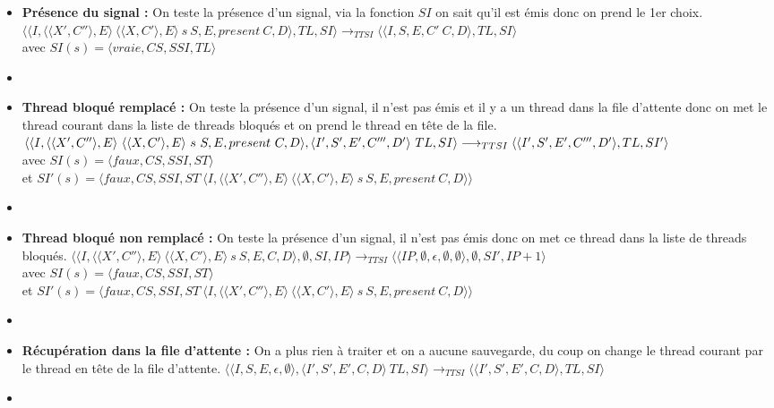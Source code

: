 \documentclass[10pt,a4paper]{report}
\begin{document}
\begin{enumerate}
\begin{itemize}
  \item[] \textbf{Présence du signal :} On teste la présence d'un signal, via la fonction $SI$ on sait qu'il est émis donc on prend le 1er choix.
    \smallbreak
    $\langle\langle I,\langle\langle X',C''\rangle,E\rangle~\langle\langle X,C'\rangle,E\rangle~s~S,E,present~C,D\rangle,TL,SI\rangle 
    \longrightarrow_{TTSI} 
    \langle\langle I,S,E,C'~C,D\rangle,TL,SI\rangle$ 
    \\avec $SI(s) = \langle vraie,CS,SSI,TL\rangle$
  \item[]
    
    
    
    
  \item[] \textbf{ Thread bloqué remplacé :} On teste la présence d'un signal, il n'est pas émis et il y a un thread dans la file d'attente donc on met le thread courant dans la liste de threads bloqués et on prend le thread en tête de la file.
    \smallbreak
    $\langle\langle I,\langle\langle X',C''\rangle,E\rangle~\langle\langle X,C'\rangle,E\rangle~s~S,E,present~C,D\rangle,\langle I',S',E',C''',D'\rangle~TL,SI\rangle 
    \\\longrightarrow_{TTSI} 
    \langle\langle I',S',E',C''',D'\rangle,TL,SI'\rangle$ 
    \\avec $SI(s) = \langle faux,CS,SSI,ST\rangle$
    \\et $SI'(s) = \langle faux,CS,SSI,ST~\langle I,\langle\langle X',C''\rangle,E\rangle~\langle\langle X,C'\rangle,E\rangle~s~S,E,present~C,D\rangle\rangle$
  \item[]	
    
  \item[] \textbf{Thread bloqué non remplacé :} On teste la présence d'un signal, il n'est pas émis donc on met ce thread dans la liste de threads bloqués.
    \smallbreak 
    $\langle\langle I,\langle\langle X',C''\rangle,E\rangle~\langle\langle X,C'\rangle,E\rangle~s~S,E,C,D\rangle,\emptyset,SI,IP\rangle 
    \longrightarrow_{TTSI} 
    \langle\langle IP,\emptyset,\epsilon,\emptyset,\emptyset\rangle,\emptyset,SI',IP+1\rangle$
    \\avec $SI(s) = \langle faux,CS,SSI,ST\rangle$
    \\et $SI'(s) = \langle faux,CS,SSI,ST~\langle I,\langle\langle X',C''\rangle,E\rangle~\langle\langle X,C'\rangle,E\rangle~s~S,E,present~C,D\rangle\rangle$
  \item[]
    
  \item[] \textbf{Récupération dans la file d'attente :} On a plus rien à traiter et on a aucune sauvegarde, du coup on change le thread courant par le thread en tête de la file d'attente.
    \smallbreak
    $\langle\langle I,S,E,\epsilon,\emptyset\rangle,\langle I',S',E',C,D\rangle~TL,SI\rangle 
    \longrightarrow_{TTSI} 
    \langle\langle I',S',E',C,D\rangle,TL,SI\rangle$
  \item[]
    

\end{itemize}
\end{enumerate}
\end{document}
